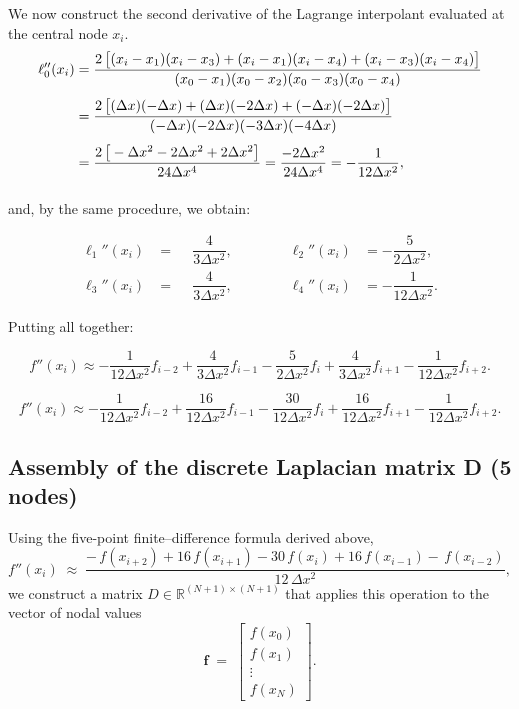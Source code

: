 We now construct the second derivative of the Lagrange interpolant evaluated at the central node $x_i$. 
\[
\begin{aligned}
\ell_0''(x_i)
  &=\frac{2\hspace{0.35em}\!\big[(x_i-x_1)(x_i-x_3)+(x_i-x_1)(x_i-x_4)+(x_i-x_3)(x_i-x_4)\big]}
          {(x_0-x_1)(x_0-x_2)(x_0-x_3)(x_0-x_4)}\\[4pt]
  &=\frac{2\hspace{0.35em}\!\big[(\Delta x)(-\Delta x)+(\Delta x)(-2\Delta x)+(-\Delta x)(-2\Delta x)\big]}
          {(-\Delta x)(-2\Delta x)(-3\Delta x)(-4\Delta x)}\\[4pt]
  &=\frac{2\hspace{0.35em}\!\big[-\Delta x^{2}-2\Delta x^{2}+2\Delta x^{2}\big]}
          {24\Delta x^{4}}
   =\frac{-2\Delta x^{2}}{24\Delta x^{4}}
   =-\frac{1}{12\Delta x^{2}},\\[1.2ex]
\end{aligned}
\]

and, by the same procedure, we obtain:

\[
\begin{aligned}
\ell_1''(x_i) &= \phantom{-}\dfrac{4}{3\Delta x^{2}}, \qquad \qquad
\ell_2''(x_i) &= -\dfrac{5}{2\Delta x^{2}},\\
\ell_3''(x_i) &= \phantom{-}\dfrac{4}{3\Delta x^{2}}, \qquad \qquad
\ell_4''(x_i) &= -\dfrac{1}{12\Delta x^{2}}.
\end{aligned}
\]

Putting all together:

\[
f''(x_i) \approx
-\frac{1}{12\Delta x^2} f_{i-2} +
\frac{4}{3\Delta x^2} f_{i-1} -
\frac{5}{2\Delta x^2} f_i +
\frac{4}{3\Delta x^2} f_{i+1} -
\frac{1}{12\Delta x^2} f_{i+2}.
\]

\[
f''(x_i) \approx
-\frac{1}{12\Delta x^2} f_{i-2} +
\frac{16}{12\Delta x^2} f_{i-1} -
\frac{30}{12\Delta x^2} f_i +
\frac{16}{12\Delta x^2} f_{i+1} -
\frac{1}{12\Delta x^2} f_{i+2}.
\]

\clearpage

\subsection{Assembly of the discrete Laplacian matrix D (5 nodes)}

Using the five-point finite–difference formula derived above,
\[
f''(x_i)\;\approx\;
\frac{-\,f(x_{i+2}) + 16\,f(x_{i+1}) - 30\,f(x_i)
      + 16\,f(x_{i-1}) -\,f(x_{i-2})}{12\,\Delta x^{2}},
\]
we construct a matrix
\(D \in \mathbb{R}^{(N+1)\times(N+1)}\) that applies this operation to
the vector of nodal values
\[
\mathbf{f} \;=\;
\begin{bmatrix}
f(x_0) \\ f(x_1) \\ \vdots \\ f(x_N)
\end{bmatrix}.
\]


